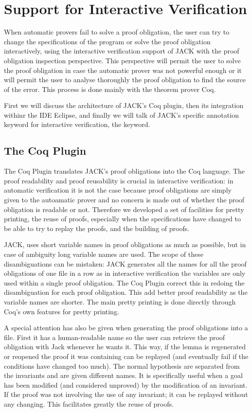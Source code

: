 


\section{Support for Interactive Verification}\label{SecInteractive}
When automatic provers fail to solve a proof obligation,
the user can try to change the specifications of the program or
 solve the proof obligation interactively, 
using the interactive verification support of JACK with
the proof obligation inspection perspective.
This perspective will permit the user to solve the proof obligation in case
the automatic prover was not powerful enough or it will permit the user to analyse 
thoroughly the proof obligation to find the source of the error.
This process is done mainly
with the theorem prover Coq. 

First we will discuss the architecture of JACK's Coq plugin, then its 
integration withinr the IDE Eclipse, and finally we will talk of
 JACK's specific annotation keyword for interactive verification, the 
\native keyword. 

\subsection{The Coq Plugin}
The Coq Plugin translates JACK's proof obligations
into the Coq language.
The proof readability and proof reusability is crucial in interactive 
verification: in automatic verification it is not the case because proof
obligations are simply given to the autoamatic prover and no concern is made
out of whether the proof obligation is readable or not.
Therefore we developed a set of facilities for %
pretty printing, the reuse of proofs, especially when the specifications 
have changed to be able to try to replay the proofs, and the building of proofs.

JACK, uses short variable names in proof obligations as much as possible, 
but in case of ambiguity long variable names are used.
The scope of these disambiguations can be mistaken: JACK generates all 
the names for all the proof obligations of one file in a row as 
in interactive verification the variables are only 
used within a single proof obligation.
The Coq Plugin correct this in redoing the disambiguation for each proof obligation.
This add better proof readability as the variable names are shorter.
The main pretty printing is done directly through Coq's own features for
pretty printing. 


A special attention has also be given when generating the proof obligations 
into a file. First it has a human-readable name so the user can retrieve 
the proof obligation with Jack whenever he wants it. 
This way, if the lemma is regenerated or reopened
 the proof it was containing can be replayed 
(and eventually fail if the conditions have changed too much).
The normal hypothesis are separated from the invariants and
are given different names.
It is specifically useful when a goal has been modified (and considered 
unproved) by the modification of an invariant. If the proof was not involving
the use of any invariant; it can be replayed without any changing. This facilitates
greatly the reuse of proofs.

